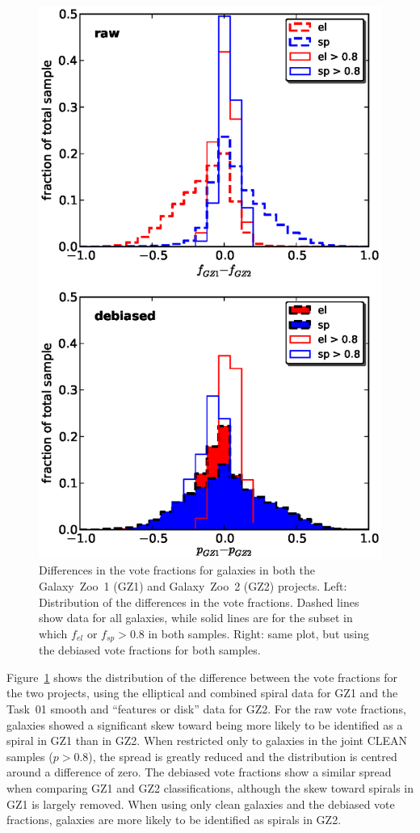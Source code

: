 \documentclass[useAMS,usenatbib]{mn2e}
\begin{document}
\begin{figure}
\includegraphics[angle=0,width=7.0in]{figures/gz1_gz2.eps}
\caption{Differences in the vote fractions for galaxies in both the Galaxy~Zoo~1 (GZ1) and Galaxy~Zoo~2 (GZ2) projects. Left: Distribution of the differences in the vote fractions. Dashed lines show data for all galaxies, while solid lines are for the subset in which $f_{el}$ or $f_{sp} > 0.8$ in both samples. Right: same plot, but using the debiased vote fractions for both samples. 
\label{fig-gz1_gz2}}
\end{figure}

Figure~\ref{fig-gz1_gz2} shows the distribution of the difference between the vote fractions for the two projects, using the elliptical and combined spiral data for GZ1 and the Task~01 smooth and ``features or disk'' data for GZ2. For the raw vote fractions, galaxies showed a significant skew toward being more likely to be identified as a spiral in GZ1 than in GZ2. When restricted only to galaxies in the joint CLEAN samples ($p>0.8$), the spread is greatly reduced and the distribution is centred around a difference of zero. The debiased vote fractions show a similar spread when comparing GZ1 and GZ2 classifications, although the skew toward spirals in GZ1 is largely removed. When using only clean galaxies and the debiased vote fractions, galaxies are more likely to be identified as spirals in GZ2. 
\end{document}
